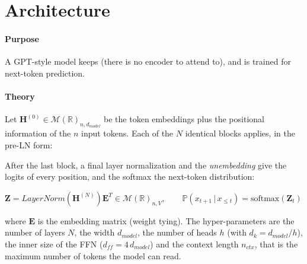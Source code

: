 \section{Architecture}
\paragraph{Purpose}
A GPT-style model keeps  (there is no encoder to attend to), and is trained for next-token
prediction.

\paragraph{Theory}
Let $\bm{H}^{(0)}\in\mathcal{M}(\mathbb{R})_{n,d_{model}}$ be the token embeddings plus the
positional information of the $n$ input tokens. Each of the $N$ identical blocks applies, in
the pre-LN form:
\begin{center}
\end{center}
After the last block, a final layer normalization and the \emph{unembedding} give the
logits of every position, and the softmax the next-token distribution:
\begin{center}
    $\bm{Z} = LayerNorm\left(\bm{H}^{(N)}\right)\bm{E}^{T}\in\mathcal{M}(\mathbb{R})_{n,V},
    \qquad \mathbb{P}\left(x_{t+1}\,|\,x_{\leq t}\right) = \mathrm{softmax}\left(
    \bm{Z}_{t}\right)$
\end{center}
where $\bm{E}$ is the embedding matrix (weight tying). The hyper-parameters are the number of
layers $N$, the width $d_{model}$, the number of heads $h$ (with $d_{k}=d_{model}/h$), the
inner size of the FFN ($d_{ff}=4\,d_{model}$) and the context length $n_{ctx}$, that is the
maximum number of tokens the model can read.

